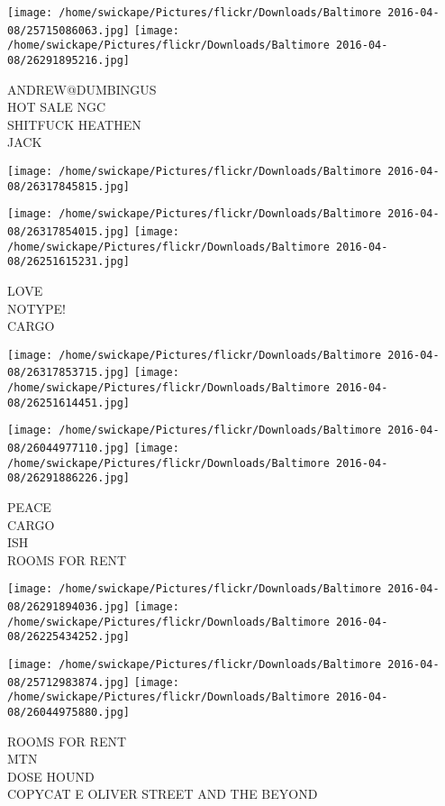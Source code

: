 \documentclass[10pt,letterpaper]{article}
\begin{document}
\texttt{[image: /home/swickape/Pictures/flickr/Downloads/Baltimore 2016-04-08/25715086063.jpg]}
\texttt{[image: /home/swickape/Pictures/flickr/Downloads/Baltimore 2016-04-08/26291895216.jpg]}

ANDREW@DUMBINGUS\\
HOT SALE NGC\\
SHITFUCK HEATHEN\\
JACK
\pagebreak

\texttt{[image: /home/swickape/Pictures/flickr/Downloads/Baltimore 2016-04-08/26317845815.jpg]}

\vspace{0.25in}
\texttt{[image: /home/swickape/Pictures/flickr/Downloads/Baltimore 2016-04-08/26317854015.jpg]}
\texttt{[image: /home/swickape/Pictures/flickr/Downloads/Baltimore 2016-04-08/26251615231.jpg]}

LOVE\\
NOTYPE!\\
CARGO
\pagebreak

\texttt{[image: /home/swickape/Pictures/flickr/Downloads/Baltimore 2016-04-08/26317853715.jpg]}
\texttt{[image: /home/swickape/Pictures/flickr/Downloads/Baltimore 2016-04-08/26251614451.jpg]}

\texttt{[image: /home/swickape/Pictures/flickr/Downloads/Baltimore 2016-04-08/26044977110.jpg]}
\texttt{[image: /home/swickape/Pictures/flickr/Downloads/Baltimore 2016-04-08/26291886226.jpg]}

PEACE\\
CARGO\\
ISH\\
ROOMS FOR RENT
\pagebreak

\texttt{[image: /home/swickape/Pictures/flickr/Downloads/Baltimore 2016-04-08/26291894036.jpg]}
\texttt{[image: /home/swickape/Pictures/flickr/Downloads/Baltimore 2016-04-08/26225434252.jpg]}

\texttt{[image: /home/swickape/Pictures/flickr/Downloads/Baltimore 2016-04-08/25712983874.jpg]}
\texttt{[image: /home/swickape/Pictures/flickr/Downloads/Baltimore 2016-04-08/26044975880.jpg]}

ROOMS FOR RENT\\
MTN\\
DOSE HOUND\\
COPYCAT E OLIVER STREET AND THE BEYOND
\pagebreak
\end{document}

